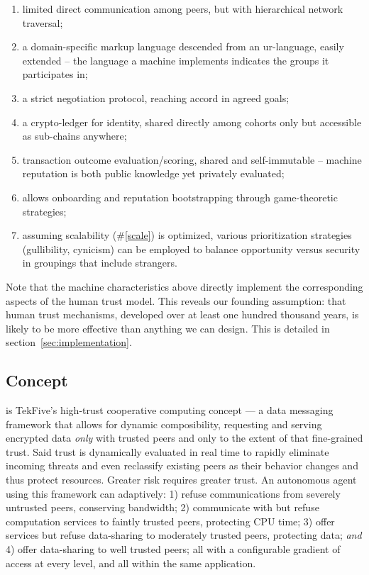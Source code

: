 \begin{enumerate}
	\item limited direct communication among peers, but with hierarchical network traversal;
	\item a domain-specific markup language descended from an ur-language, easily extended -- the language a machine implements indicates the groups it participates in;
	\item a strict negotiation protocol, reaching accord in agreed goals;
	\item a crypto-ledger for identity, shared directly among cohorts only but accessible as sub-chains anywhere;
	\item transaction outcome evaluation/scoring, shared and self-immutable -- machine reputation is both public knowledge yet privately evaluated;
	\item allows onboarding and reputation bootstrapping through game-theoretic strategies;
	\item assuming scalability (\#\ref{scale}) is optimized, various prioritization strategies (gullibility, cynicism) can be employed to balance opportunity versus security in groupings that include strangers.
\end{enumerate}
Note that the machine characteristics above directly implement the corresponding aspects of the human trust model.
This reveals our founding assumption: that human trust mechanisms, developed over at least one hundred thousand years, is likely to be more effective than anything we can design.
This is detailed in section~\ref{sec:implementation}.


\subsection{Concept}\label{subsec:concept}

\textbf{\projectName}is TekFive's high-trust cooperative computing concept --- a data messaging framework that allows for dynamic composibility, requesting and serving encrypted data \textit{only} with trusted peers and only to the extent of that fine-grained trust.
Said trust is dynamically evaluated in real time to rapidly eliminate incoming threats and even reclassify existing peers as their behavior changes and thus protect resources.
Greater risk requires greater trust.
An autonomous agent using this framework can adaptively: 1) refuse communications from severely untrusted peers, conserving bandwidth; 2) communicate with but refuse computation services to faintly trusted peers, protecting CPU time; 3) offer services but refuse data-sharing to moderately trusted peers, protecting data; \textit{and} 4) offer data-sharing to well trusted peers; all with a configurable gradient of access at every level, and all within the same application.

